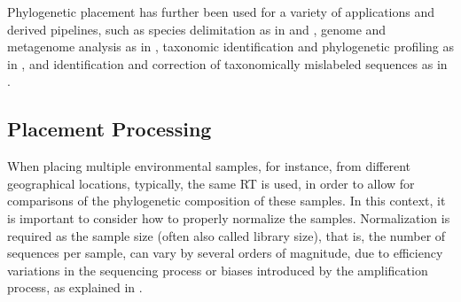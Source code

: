 Phylogenetic placement has further been used for a variety of applications and derived pipelines, such as
species delimitation as in  \cite{Zhang2013} and  \cite{Kapli2017},
genome and metagenome analysis as in  \cite{Darling2014},
taxonomic identification and phylogenetic profiling as in  \cite{Nguyen2014}, and
identification and correction of taxonomically mislabeled sequences as in  \cite{Kozlov2016}.



\subsection{Placement Processing}
\label{ch:Foundations:sec:PhylogeneticPlacement:sub:PlacementProcessing}


When placing multiple environmental samples, for instance, from different geographical locations,
typically, the same \ac{RT} is used, in order to allow for comparisons of the phylogenetic composition of these samples.
In this context, it is important to consider how to properly normalize the samples.
Normalization is required as the sample size (often also called library size),
that is, the number of sequences per sample, can vary by several orders of magnitude,
due to efficiency variations in the sequencing process or biases introduced by the amplification process,
as explained in .


